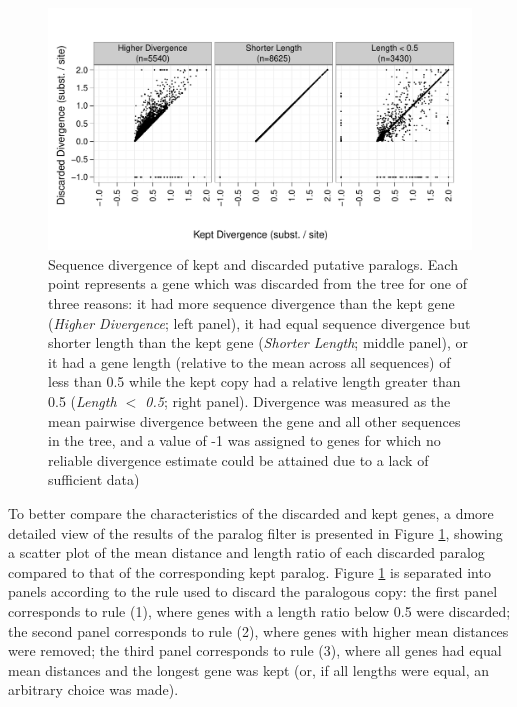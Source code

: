 \begin{figure}
\centering
\includegraphics[scale=0.7]{Figs/filtered_paralogs_scatter.pdf}
\caption{Sequence divergence of kept and discarded putative
  paralogs. Each point represents a gene which was discarded from the
  tree for one of three reasons: it had more sequence divergence than
  the kept gene (\emph{Higher Divergence}; left panel), it had equal
  sequence divergence but shorter length than the kept gene
  (\emph{Shorter Length}; middle panel), or it had a gene length
  (relative to the mean across all sequences) of less than 0.5 while
  the kept copy had a relative length greater than 0.5 (\emph{Length
    $<$ 0.5}; right panel). Divergence was measured as the mean
  pairwise divergence between the gene and all other sequences in the
  tree, and a value of -1 was assigned to genes for which no reliable
  divergence estimate could be attained due to a lack of sufficient
  data)}
\label{filtered_paralogs_scatter}
\end{figure}

To better compare the characteristics of the discarded and kept genes,
a dmore detailed view of the results of the paralog filter is
presented in Figure \ref{filtered_paralogs_scatter}, showing a scatter
plot of the mean distance and length ratio of each discarded paralog
compared to that of the corresponding kept paralog. Figure
\ref{filtered_paralogs_scatter} is separated into panels according to
the rule used to discard the paralogous copy: the first panel
corresponds to rule (1), where genes with a length ratio below 0.5
were discarded; the second panel corresponds to rule (2), where genes
with higher mean distances were removed; the third panel corresponds
to rule (3), where all genes had equal mean distances and the longest
gene was kept (or, if all lengths were equal, an arbitrary choice was
made).

